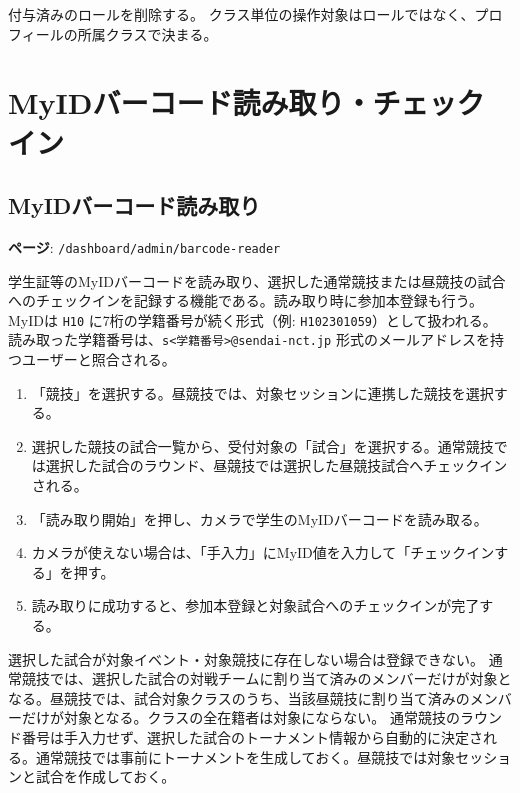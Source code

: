 \documentclass[12pt]{ltjsarticle}
\newcommand{\code}[1]{\colorbox{gray!20}{\texttt{#1}}}
\begin{document}
付与済みのロールを削除する。
クラス単位の操作対象はロールではなく、プロフィールの所属クラスで決まる。

\newpage

\section{MyIDバーコード読み取り・チェックイン}\label{sec:myid}

\subsection{MyIDバーコード読み取り}

\textbf{ページ}: \code{/dashboard/admin/barcode-reader}

学生証等のMyIDバーコードを読み取り、選択した通常競技または昼競技の試合へのチェックインを記録する機能である。読み取り時に参加本登録も行う。
MyIDは \code{H10} に7桁の学籍番号が続く形式（例: \code{H102301059}）として扱われる。
読み取った学籍番号は、\code{s<学籍番号>@sendai-nct.jp} 形式のメールアドレスを持つユーザーと照合される。

\begin{enumerate}
  \item 「競技」を選択する。昼競技では、対象セッションに連携した競技を選択する。
  \item 選択した競技の試合一覧から、受付対象の「試合」を選択する。通常競技では選択した試合のラウンド、昼競技では選択した昼競技試合へチェックインされる。
  \item 「読み取り開始」を押し、カメラで学生のMyIDバーコードを読み取る。
  \item カメラが使えない場合は、「手入力」にMyID値を入力して「チェックインする」を押す。
  \item 読み取りに成功すると、参加本登録と対象試合へのチェックインが完了する。
\end{enumerate}

選択した試合が対象イベント・対象競技に存在しない場合は登録できない。
通常競技では、選択した試合の対戦チームに割り当て済みのメンバーだけが対象となる。昼競技では、試合対象クラスのうち、当該昼競技に割り当て済みのメンバーだけが対象となる。クラスの全在籍者は対象にならない。
通常競技のラウンド番号は手入力せず、選択した試合のトーナメント情報から自動的に決定される。通常競技では事前にトーナメントを生成しておく。昼競技では対象セッションと試合を作成しておく。
\end{document}

